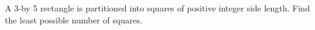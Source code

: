 A 3-by 5 rectangle is partitioned into squares of positive integer side length. Find the least possible number of squares.
